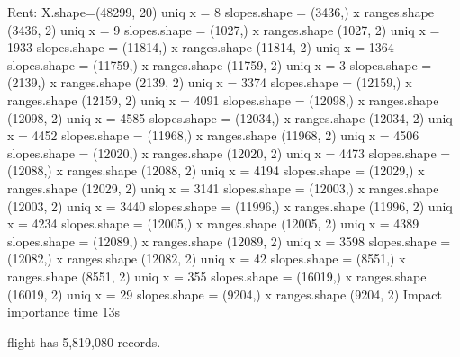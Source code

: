 \documentclass[11pt]{article}
\begin{document}
{Rent:
X.shape=(48299, 20)
uniq x = 8 slopes.shape = (3436,) x ranges.shape (3436, 2)
uniq x = 9 slopes.shape = (1027,) x ranges.shape (1027, 2)
uniq x = 1933 slopes.shape = (11814,) x ranges.shape (11814, 2)
uniq x = 1364 slopes.shape = (11759,) x ranges.shape (11759, 2)
uniq x = 3 slopes.shape = (2139,) x ranges.shape (2139, 2)
uniq x = 3374 slopes.shape = (12159,) x ranges.shape (12159, 2)
uniq x = 4091 slopes.shape = (12098,) x ranges.shape (12098, 2)
uniq x = 4585 slopes.shape = (12034,) x ranges.shape (12034, 2)
uniq x = 4452 slopes.shape = (11968,) x ranges.shape (11968, 2)
uniq x = 4506 slopes.shape = (12020,) x ranges.shape (12020, 2)
uniq x = 4473 slopes.shape = (12088,) x ranges.shape (12088, 2)
uniq x = 4194 slopes.shape = (12029,) x ranges.shape (12029, 2)
uniq x = 3141 slopes.shape = (12003,) x ranges.shape (12003, 2)
uniq x = 3440 slopes.shape = (11996,) x ranges.shape (11996, 2)
uniq x = 4234 slopes.shape = (12005,) x ranges.shape (12005, 2)
uniq x = 4389 slopes.shape = (12089,) x ranges.shape (12089, 2)
uniq x = 3598 slopes.shape = (12082,) x ranges.shape (12082, 2)
uniq x = 42 slopes.shape = (8551,) x ranges.shape (8551, 2)
uniq x = 355 slopes.shape = (16019,) x ranges.shape (16019, 2)
uniq x = 29 slopes.shape = (9204,) x ranges.shape (9204, 2)
Impact importance time 13s

flight has 5,819,080 records.
}
\end{document}
